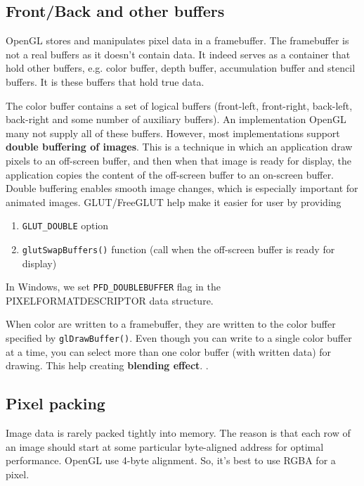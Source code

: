 \subsection{Front/Back and other buffers}
\label{sec:frontb-other-buff}

OpenGL stores and manipulates pixel data in a framebuffer. The
framebuffer is not a real buffers as it doesn't contain data. It
indeed serves as a container that hold other buffers, e.g. color
buffer, depth buffer, accumulation buffer and stencil buffers. It is
these buffers that hold true data. 

The color buffer contains a set of logical buffers (front-left,
front-right, back-left, back-right and some number of auxiliary
buffers). An implementation OpenGL many not supply all of these
buffers. However, most implementations support {\bf double buffering
  of images}. This is a technique in which an application draw pixels
to an off-screen buffer, and then when that image is ready for
display, the application copies the content of the off-screen buffer
to an on-screen buffer. Double buffering enables smooth image changes,
which is especially important for animated images. GLUT/FreeGLUT
help make it easier for user by providing
\begin{enumerate}
\item \verb!GLUT_DOUBLE! option
\item \verb!glutSwapBuffers()! function (call when the off-screen
  buffer is ready for display)
\end{enumerate}

In Windows, we set \verb!PFD_DOUBLEBUFFER! flag in the
PIXELFORMATDESCRIPTOR data structure. 

When color are written to a framebuffer, they are written to the color
buffer specified by \verb!glDrawBuffer()!. Even though you can write
to a single color buffer at a time, you can select more than one color
buffer (with written data) for drawing. This help creating {\bf
  blending effect}. .

\subsection{Pixel packing}
\label{sec:pixel-packing}

Image data is rarely packed tightly into memory. The reason is that
each row of an image should start at some particular byte-aligned
address for optimal performance. OpenGL use 4-byte alignment. So, it's
best to use RGBA for a pixel. 

